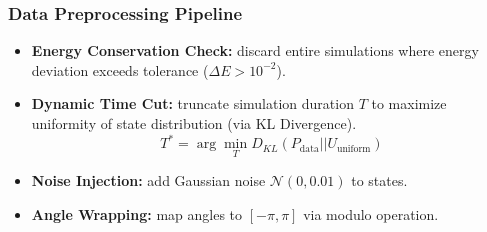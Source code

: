 \begin{frame}
    \frametitle{Data Preprocessing Pipeline}
    
    \begin{itemize}
        \item \textbf{Energy Conservation Check:} 
        discard entire simulations where energy deviation exceeds tolerance ($\Delta E > 10^{-2}$).
    \end{itemize}

    \vspace{1em}

    \begin{itemize}
        \item \textbf{Dynamic Time Cut:} 
        truncate simulation duration $T$ to maximize uniformity of state distribution (via KL Divergence).
        \[ T^* = \arg\min_T D_{KL}(P_{\text{data}} || U_{\text{uniform}}) \]
    \end{itemize}

    \vspace{1em}

    \begin{itemize}
        \item \textbf{Noise Injection:} add Gaussian noise $\mathcal{N}(0, 0.01)$ to states.
        \item \textbf{Angle Wrapping:} map angles to $[-\pi, \pi]$ via modulo operation.
    \end{itemize}

\end{frame}

